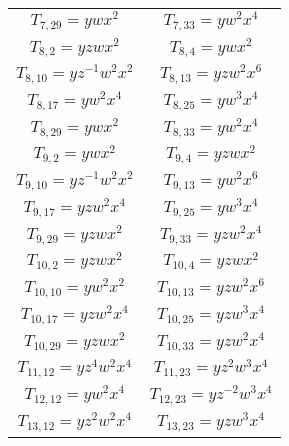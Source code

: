 \begin{longtable}{|c|c|}
$T_{7,29}= ywx^2$&

$T_{7,33}= yw^2x^4$\\

$T_{8,2}= yzwx^2$&

$T_{8,4}= ywx^2$\\

$T_{8,10}= yz^{-1}w^2x^2$&

$T_{8,13}= yzw^2x^6$\\

$T_{8,17}= yw^2x^4$&

$T_{8,25}= yw^3x^4$\\

$T_{8,29}= ywx^2$&

$T_{8,33}= yw^2x^4$\\

$T_{9,2}= ywx^2$&

$T_{9,4}= yzwx^2$\\

$T_{9,10}= yz^{-1}w^2x^2$&

$T_{9,13}= yw^2x^6$\\

$T_{9,17}= yzw^2x^4$&

$T_{9,25}= yw^3x^4$\\

$T_{9,29}= yzwx^2$&

$T_{9,33}= yzw^2x^4$\\

$T_{10,2}= yzwx^2$&

$T_{10,4}= yzwx^2$\\

$T_{10,10}= yw^2x^2$ &

$T_{10,13}= yzw^2x^6$\\

$T_{10,17}= yzw^2x^4$&

$T_{10,25}= yzw^3x^4$\\

$T_{10,29}= yzwx^2$&

$T_{10,33}= yzw^2x^4$\\

$T_{11,12}= yz^4w^2x^4$&

$T_{11,23}= yz^2w^3x^4$\\

$T_{12,12}= yw^2x^4$&

$T_{12,23}= yz^{-2}w^3x^4$\\
 
$T_{13,12}= yz^2w^2x^4$& 

$T_{13,23}= yzw^3x^4$\\


\end{longtable}

